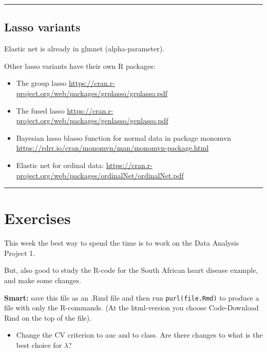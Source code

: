 \documentclass[
]{article}
\providecommand{\tightlist}{%
  \setlength{\itemsep}{0pt}\setlength{\parskip}{0pt}}
\begin{document}
\begin{center}\rule{0.5\linewidth}{0.5pt}\end{center}

\hypertarget{lasso-variants}{%
\subsection{Lasso variants}\label{lasso-variants}}

Elastic net is already in glmnet (alpha-parameter).

Other lasso variants have their own R packages:

\begin{itemize}
\item
  The group lasso
  \url{https://cran.r-project.org/web/packages/grplasso/grplasso.pdf}
\item
  The fused lasso
  \url{https://cran.r-project.org/web/packages/genlasso/genlasso.pdf}
\item
  Bayesian lasso blasso function for normal data in package monomvn
  \url{https://rdrr.io/cran/monomvn/man/monomvn-package.html}
\item
  Elastic net for ordinal data:
  \url{https://cran.r-project.org/web/packages/ordinalNet/ordinalNet.pdf}
\end{itemize}

\begin{center}\rule{0.5\linewidth}{0.5pt}\end{center}

\hypertarget{exercises}{%
\section{Exercises}\label{exercises}}

This week the best way to spend the time is to work on the Data Analysis
Project 1.

But, also good to study the R-code for the South African heart disease
example, and make some changes.

\textbf{Smart:} save this file as an .Rmd file and then run
\texttt{purl(file.Rmd)} to produce a file with only the R-commands. (At
the html-version you choose Code-Download Rmd on the top of the file).

\begin{itemize}
\tightlist
\item
  Change the CV criterion to auc and to class. Are there changes to what
  is the best choice for \(\lambda\)?
\end{itemize}
\end{document}
